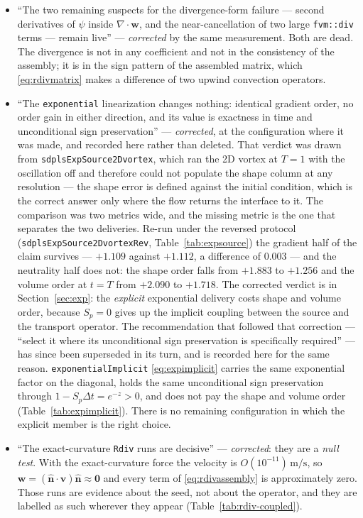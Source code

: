 \documentclass[preprint,3p,11pt]{elsarticle}
\newcommand{\psilev}{\psi}
\newcommand{\nhat}{\hat{\mathbf{n}}}
\begin{document}
\begin{itemize}
    noise and assembly inconsistency --- are therefore bounded and second-order
    convergent, and neither explains the divergence; the mechanism that does is in
    Section~\ref{sec:rdiv-mechanism}.
  \item ``The two remaining suspects for the divergence-form failure ---
    second derivatives of $\psilev$ inside $\nabla\cdot\mathbf{w}$, and the
    near-cancellation of two large \texttt{fvm::div} terms --- remain live'' ---
    \emph{corrected} by the same measurement. Both are dead. The divergence is not
    in any coefficient and not in the consistency of the assembly; it is in the
    sign pattern of the assembled matrix, which \eqref{eq:rdivmatrix} makes a
    difference of two upwind convection operators.
  \item ``The \texttt{exponential} linearization changes nothing: identical
    gradient order, no order gain in either direction, and its value is exactness
    in time and unconditional sign preservation'' --- \emph{corrected}, at the
    configuration where it was made, and recorded here rather than deleted. That
    verdict was drawn from \texttt{sdplsExpSource2Dvortex}, which ran the 2D
    vortex at $T=1$ with the oscillation off and therefore could not populate the
    shape column at any resolution --- the shape error is defined against the
    initial condition, which is the correct answer only where the flow returns
    the interface to it. The comparison was two metrics wide, and the missing
    metric is the one that separates the two deliveries. Re-run under the
    reversed protocol (\texttt{sdplsExpSource2DvortexRev},
    Table~\ref{tab:expsource}) the gradient half of the claim survives ---
    $+1.109$ against $+1.112$, a difference of $0.003$ --- and the neutrality
    half does not: the shape order falls from $+1.883$ to $+1.256$ and the volume
    order at $t=T$ from $+2.090$ to $+1.718$. The corrected verdict is in
    Section~\ref{sec:exp}: the \emph{explicit} exponential delivery costs shape and
    volume order, because $S_p=0$ gives up the implicit coupling between the source
    and the transport operator. The recommendation that followed that correction ---
    ``select it where its unconditional sign preservation is specifically required''
    --- has since been superseded in its turn, and is recorded here for the same
    reason. \texttt{exponentialImplicit} \eqref{eq:expimplicit} carries the same
    exponential factor on the diagonal, holds the same unconditional sign
    preservation through $1 - S_p\Delta t = e^{-z} > 0$, and does not pay the shape
    and volume order (Table~\ref{tab:expimplicit}). There is no remaining
    configuration in which the explicit member is the right choice.
  \item ``The exact-curvature \texttt{Rdiv} runs are decisive'' ---
    \emph{corrected}: they are a \emph{null test}. With the exact-curvature force
    the velocity is $O(10^{-11})\,\mathrm{m/s}$, so
    $\mathbf{w} = (\nhat\cdot\mathbf{v})\nhat \approx \mathbf{0}$ and every term
    of \eqref{eq:rdivassembly} is approximately zero. Those runs are evidence
    about the seed, not about the operator, and they are labelled as such wherever
    they appear (Table~\ref{tab:rdiv-coupled}).
\end{itemize}
\end{document}
